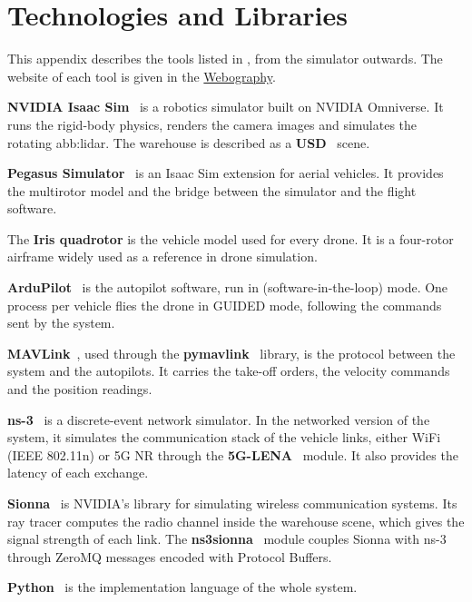 \chapter{Technologies and Libraries}%
\label{app:tools}

This appendix describes the tools listed in , from the
simulator outwards. The website of each tool is given in the
\hyperref[chap:webography]{Webography}.

\textbf{NVIDIA Isaac Sim}~
is a robotics simulator built on NVIDIA Omniverse. It runs the rigid-body
physics, renders the camera images and simulates the rotating \gls{abb:lidar}.
The warehouse is described as a \textbf{USD}~
scene.

\textbf{Pegasus
    Simulator}~
is an Isaac Sim extension for aerial vehicles. It provides the multirotor model
and the bridge between the simulator and the flight software.

The \textbf{Iris quadrotor} is the vehicle model used for every drone. It is a
four-rotor airframe widely used as a reference in drone simulation.

\textbf{ArduPilot}~ is the autopilot
software, run in  (software-in-the-loop) mode. One process
per vehicle flies the drone in GUIDED mode, following the commands sent by the
system.

\textbf{MAVLink}~, used through the
\textbf{pymavlink}~
library, is the protocol between the system and the autopilots. It carries the
take-off orders, the velocity commands and the position readings.

\textbf{ns-3}~ is a discrete-event network
simulator. In the networked version of the system, it simulates the
communication stack of the vehicle links, either WiFi (IEEE 802.11n) or 5G NR
through the \textbf{5G-LENA}~ module. It
also provides the latency of each exchange.

\textbf{Sionna}~ is NVIDIA's
library for simulating wireless communication systems. Its ray tracer computes
the radio channel inside the warehouse scene, which gives the signal strength of
each link. The
\textbf{ns3sionna}~ module
couples Sionna with ns-3 through ZeroMQ messages encoded with Protocol Buffers.

\textbf{Python}~ is the implementation
language of the whole system.

